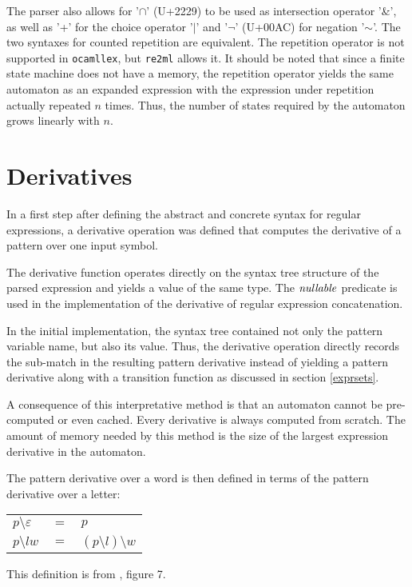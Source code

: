 The parser also allows for '$\cap$' (U+2229) to be used as intersection operator
'\&', as well as '+' for the choice operator '$|$' and '$\neg$' (U+00AC) for
negation '$\sim$'. The two syntaxes for counted repetition are equivalent.  The
repetition operator is not supported in \texttt{ocamllex}, but \texttt{re2ml}
allows it. It should be noted that since a finite state machine does not have a
memory, the repetition operator yields the same automaton as an expanded
expression with the expression under repetition actually repeated $n$ times.
Thus, the number of states required by the automaton grows linearly with $n$.


\section{Derivatives}

In a first step after defining the abstract and concrete syntax for regular
expressions, a derivative operation was defined that computes the derivative of
a pattern over one input symbol.

The derivative function operates directly on the syntax tree structure of the
parsed expression and yields a value of the same type. The $\mathit{nullable}$ predicate
is used in the implementation of the derivative of regular expression
concatenation.

In the initial implementation, the syntax tree contained not only the pattern
variable name, but also its value. Thus, the derivative operation directly
records the sub-match in the resulting pattern derivative instead of yielding a
pattern derivative along with a transition function as discussed in section
\ref{exprsets}.

A consequence of this interpretative method is that an automaton cannot be
pre-computed or even cached. Every derivative is always computed from scratch.
The amount of memory needed by this method is the size of the largest expression
derivative in the automaton.

The pattern derivative over a word is then defined in terms of the pattern
derivative over a letter:

\begin{tabular}{lrl}
   $p \setminus \varepsilon$	& $=$ & $p$				\\
   $p \setminus lw$		& $=$ & $(p \setminus l) \setminus w$	\\
\end{tabular}

This definition is from \cite{pdpat}, figure 7.

